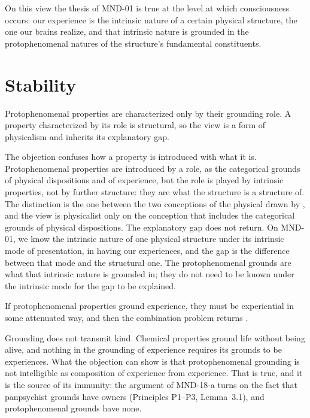 \documentclass{situationist-preprint}
\begin{document}
On this view the thesis of MND-01 is true at the level at which consciousness occurs: our experience is the intrinsic nature of a certain physical structure, the one our brains realize, and that intrinsic nature is grounded in the protophenomenal natures of the structure's fundamental constituents.

\section{Stability}

\begin{objection}
Protophenomenal properties are characterized only by their grounding role. A property characterized by its role is structural, so the view is a form of physicalism and inherits its explanatory gap.
\end{objection}

\begin{reply}
The objection confuses how a property is introduced with what it is. Protophenomenal properties are introduced by a role, as the categorical grounds of physical dispositions and of experience, but the role is played by intrinsic properties, not by further structure: they are what the structure is a structure of. The distinction is the one between the two conceptions of the physical drawn by \citet{Stoljar2001}, and the view is physicalist only on the conception that includes the categorical grounds of physical dispositions. The explanatory gap does not return. On MND-01, we know the intrinsic nature of one physical structure under its intrinsic mode of presentation, in having our experiences, and the gap is the difference between that mode and the structural one. The protophenomenal grounds are what that intrinsic nature is grounded in; they do not need to be known under the intrinsic mode for the gap to be explained.
\end{reply}

\begin{objection}
If protophenomenal properties ground experience, they must be experiential in some attenuated way, and then the combination problem returns \citep{Goff2017}.
\end{objection}

\begin{reply}
Grounding does not transmit kind. Chemical properties ground life without being alive, and nothing in the grounding of experience requires its grounds to be experiences. What the objection can show is that protophenomenal grounding is not intelligible as composition of experience from experience. That is true, and it is the source of its immunity: the argument of MND-18-a turns on the fact that panpsychist grounds have owners (Principles P1--P3, Lemma~3.1), and protophenomenal grounds have none.
\end{reply}
\end{document}
